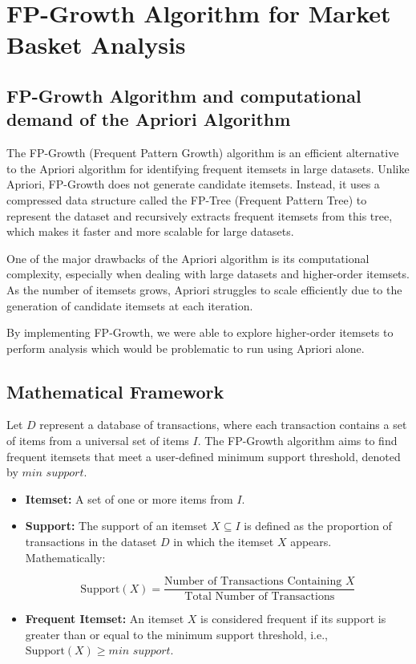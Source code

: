 \documentclass{article}
\begin{document}
\section{FP-Growth Algorithm for Market Basket Analysis}
\subsection{FP-Growth Algorithm and computational demand of the Apriori Algorithm}

The FP-Growth (Frequent Pattern Growth) algorithm is an efficient alternative to the Apriori algorithm for identifying frequent itemsets in large datasets. Unlike Apriori, FP-Growth does not generate candidate itemsets. Instead, it uses a compressed data structure called the FP-Tree (Frequent Pattern Tree) to represent the dataset and recursively extracts frequent itemsets from this tree, which makes it faster and more scalable for large datasets.

One of the major drawbacks of the Apriori algorithm is its computational complexity, especially when dealing with large datasets and higher-order itemsets. As the number of itemsets grows, Apriori struggles to scale efficiently due to the generation of candidate itemsets at each iteration.

By implementing FP-Growth, we were able to explore higher-order itemsets to perform analysis which would be problematic to run using Apriori alone.


\subsection{Mathematical Framework}
Let $D$ represent a database of transactions, where each transaction contains a set of items from a universal set of items $I$. The FP-Growth algorithm aims to find frequent itemsets that meet a user-defined minimum support threshold, denoted by $\textit{min support}$.

\begin{itemize}
    \item \textbf{Itemset:} A set of one or more items from $I$.
    \item \textbf{Support:} The support of an itemset $X \subseteq I$ is defined as the proportion of transactions in the dataset $D$ in which the itemset $X$ appears. Mathematically:

\[
\text{Support}(X) = \frac{\text{Number of Transactions Containing } X}{\text{Total Number of Transactions}}
\]

    \item \textbf{Frequent Itemset:} An itemset $X$ is considered frequent if its support is greater than or equal to the minimum support threshold, i.e., $\text{Support}(X) \geq \textit{min support}$.
\end{itemize}
\end{document}
